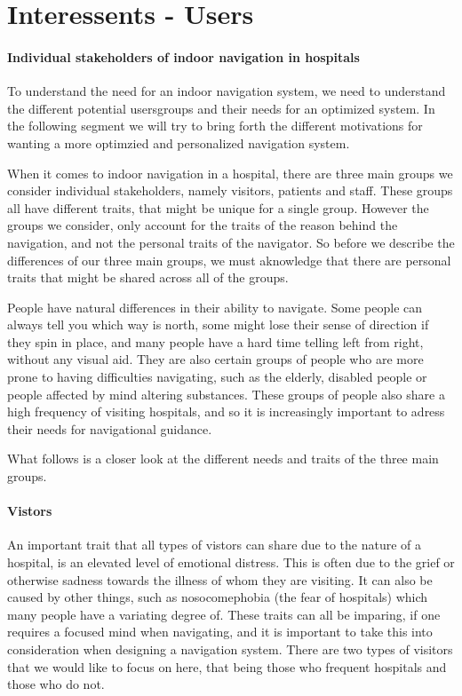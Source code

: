 \section{Interessents - Users} %
\label{sec:interusers}


\paragraph{Individual stakeholders of indoor navigation in hospitals}

To understand the need for an indoor navigation system, we need to understand the different potential usersgroups and their needs for an optimized system. In the following segment we will try to bring forth the different motivations for wanting a more optimzied and personalized navigation system.

When it comes to indoor navigation in a hospital, there are three main groups we consider individual stakeholders, namely visitors, patients and staff. These groups all have different traits, that might be unique for a single group. However the groups we consider, only account for the traits of the reason behind the navigation, and not the personal traits of the navigator. So before we describe the differences of our three main groups, we must aknowledge that there are personal traits that might be shared across all of the groups.

People have natural differences in their ability to navigate. Some people can always tell you which way is north, some might lose their sense of direction if they spin in place, and many people have a hard time telling left from right, without any visual aid. They are also certain groups of people who are more prone to having difficulties navigating, such as the elderly, disabled people or people affected by mind altering substances. These groups of people also share a high frequency of visiting hospitals, and so it is increasingly important to adress their needs for navigational guidance.

What follows is a closer look at the different needs and traits of the three main groups.

\paragraph{Vistors} %
 \label{par:vistors}
 

An important trait that all types of vistors can share due to the nature of a hospital, is an elevated level of emotional distress. This is often due to the grief or otherwise sadness towards the illness of whom they are visiting. It can also be caused by other things, such as nosocomephobia (the fear of hospitals) which many people have a variating degree of. These traits can all be imparing, if one requires a focused mind when navigating, and it is important to take this into consideration when designing a navigation system. There are two types of visitors that we would like to focus on here, that being those who frequent hospitals and those who do not.

